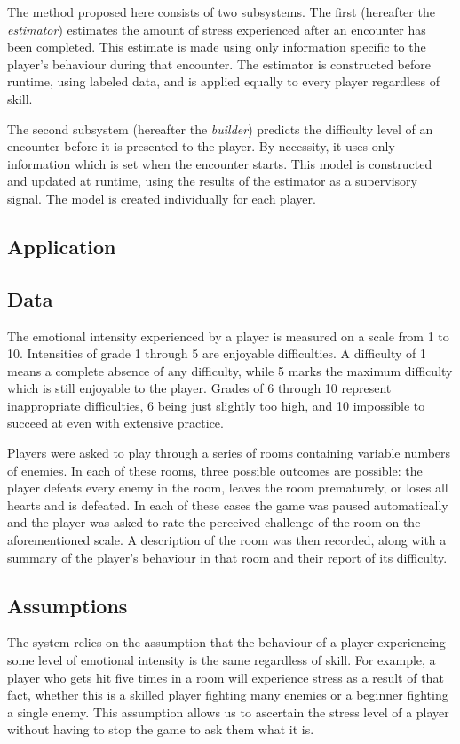 \documentclass[a4paper]{article}
\begin{document}
\begin{multicols*}{2}
The method proposed here consists of two subsystems. The first (hereafter the \emph{estimator}) estimates the amount of stress experienced after an encounter has been completed. This estimate is made using only information specific to the player's behaviour during that encounter. The estimator is constructed before runtime, using labeled data, and is applied equally to every player regardless of skill.

The second subsystem (hereafter the \emph{builder}) predicts the difficulty level of an encounter before it is presented to the player. By necessity, it uses only information which is set when the encounter starts. This model is constructed and updated at runtime, using the results of the estimator as a supervisory signal. The model is created individually for each player.

\subsection{Application}

\subsection{Data} \label{data}
The emotional intensity experienced by a player is measured on a scale from 1 to 10. Intensities of grade 1 through 5 are enjoyable difficulties. A difficulty of 1 means a complete absence of any difficulty, while 5 marks the maximum difficulty which is still enjoyable to the player. Grades of 6 through 10 represent inappropriate difficulties, 6 being just slightly too high, and 10 impossible to succeed at even with extensive practice.

Players were asked to play through a series of rooms containing variable numbers of enemies. In each of these rooms, three possible outcomes are possible: the player  defeats every enemy in the room, leaves the room prematurely, or loses all hearts and is defeated. In each of these cases the game was paused automatically and the player was asked to rate the perceived challenge of the room on the aforementioned scale. A description of the room was then recorded, along with a summary of the player's behaviour in that room and their report of its difficulty.

\subsection{Assumptions}
The system relies on the assumption that the behaviour of a player experiencing some level of emotional intensity is the same regardless of skill. For example, a player who gets hit five times in a room will experience stress as a result of that fact, whether this is a skilled player fighting many enemies or a beginner fighting a single enemy. This assumption allows us to ascertain the stress level of a player without having to stop the game to ask them what it is.


\end{multicols*}
\end{document}
